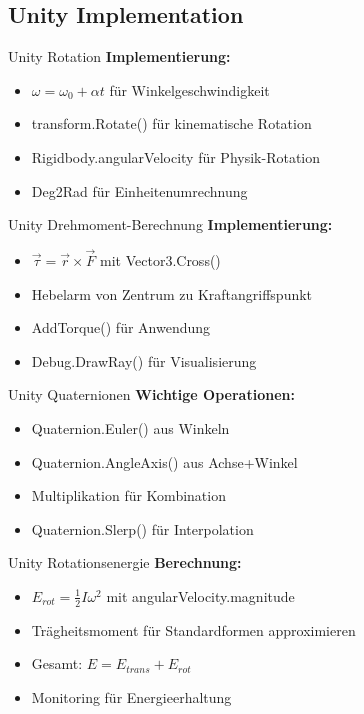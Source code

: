 \subsection{Unity Implementation}

\begin{concept}{Unity Rotation}
    \textbf{Implementierung:}
    \begin{itemize}
        \item $\omega = \omega_0 + \alpha t$ für Winkelgeschwindigkeit
        \item transform.Rotate() für kinematische Rotation
        \item Rigidbody.angularVelocity für Physik-Rotation
        \item Deg2Rad für Einheitenumrechnung
    \end{itemize}
\end{concept}

\begin{concept}{Unity Drehmoment-Berechnung}
    \textbf{Implementierung:}
    \begin{itemize}
        \item $\vec{\tau} = \vec{r} \times \vec{F}$ mit Vector3.Cross()
        \item Hebelarm von Zentrum zu Kraftangriffspunkt
        \item AddTorque() für Anwendung
        \item Debug.DrawRay() für Visualisierung
    \end{itemize}
\end{concept}

\begin{concept}{Unity Quaternionen}
    \textbf{Wichtige Operationen:}
    \begin{itemize}
        \item Quaternion.Euler() aus Winkeln
        \item Quaternion.AngleAxis() aus Achse+Winkel
        \item Multiplikation für Kombination
        \item Quaternion.Slerp() für Interpolation
    \end{itemize}
\end{concept}

\begin{concept}{Unity Rotationsenergie}
    \textbf{Berechnung:}
    \begin{itemize}
        \item $E_{rot} = \frac{1}{2}I\omega^2$ mit angularVelocity.magnitude
        \item Trägheitsmoment für Standardformen approximieren
        \item Gesamt: $E = E_{trans} + E_{rot}$
        \item Monitoring für Energieerhaltung
    \end{itemize}
\end{concept}

